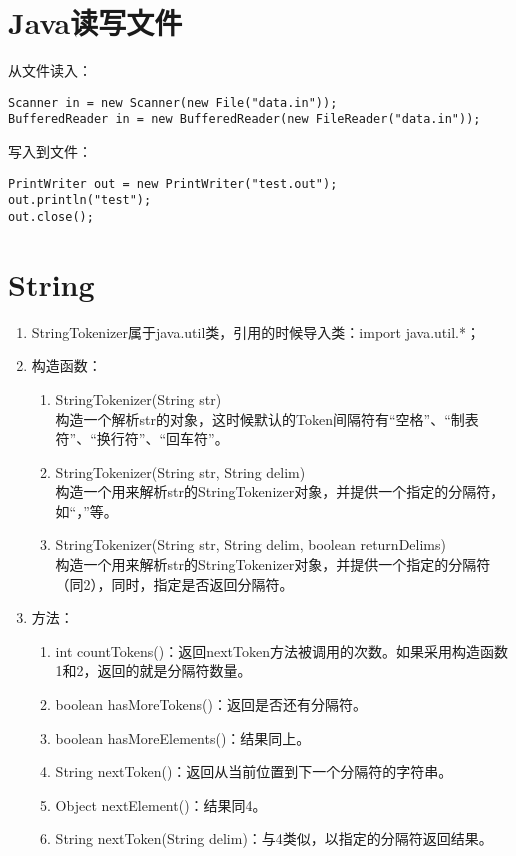 \section{Java读写文件}

从文件读入：

\begin{lstlisting}
Scanner in = new Scanner(new File("data.in"));
BufferedReader in = new BufferedReader(new FileReader("data.in"));
\end{lstlisting}

写入到文件：

\begin{lstlisting}
PrintWriter out = new PrintWriter("test.out");
out.println("test");
out.close();
\end{lstlisting}

\section{String}

\begin{enumerate}
  \item StringTokenizer属于java.util类，引用的时候导入类：import java.util.*；
  \item 构造函数：
    \begin{enumerate}
      \item StringTokenizer(String str) \\
            构造一个解析str的对象，这时候默认的Token间隔符有“空格”、“制表符”、“换行符”、“回车符”。
      \item StringTokenizer(String str, String delim) \\
            构造一个用来解析str的StringTokenizer对象，并提供一个指定的分隔符，如“，”等。
      \item StringTokenizer(String str, String delim, boolean returnDelims) \\
            构造一个用来解析str的StringTokenizer对象，并提供一个指定的分隔符（同2），同时，指定是否返回分隔符。
    \end{enumerate}
  \item 方法：
    \begin{enumerate}
      \item int countTokens()：返回nextToken方法被调用的次数。如果采用构造函数1和2，返回的就是分隔符数量。
      \item boolean hasMoreTokens()：返回是否还有分隔符。
      \item boolean hasMoreElements()：结果同上。
      \item String nextToken()：返回从当前位置到下一个分隔符的字符串。
      \item Object nextElement()：结果同4。
      \item String nextToken(String delim)：与4类似，以指定的分隔符返回结果。
    \end{enumerate}
\end{enumerate}

